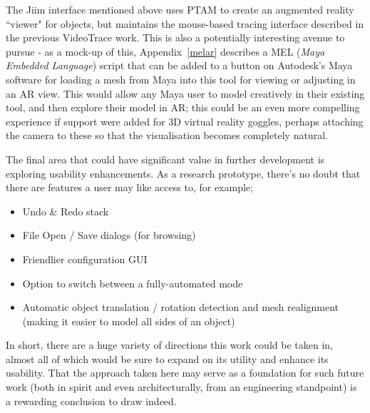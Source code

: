 \documentclass[a4paper,10pt]{article}
\begin{document}
The Jiim interface mentioned above uses PTAM to create an augmented reality ``viewer" for objects, but maintains the mouse-based tracing interface described in the previous VideoTrace work. This is also a potentially interesting avenue to pursue - as a mock-up of this, Appendix~\ref{melar} describes a MEL (\textit{Maya Embedded Language}) script that can be added to a button on Autodesk's Maya software for loading a mesh from Maya into this tool for viewing or adjusting in an AR view. This would allow any Maya user to model creatively in their existing tool, and then explore their model in AR; this could be an even more compelling experience if support were added for 3D virtual reality goggles, perhaps attaching the camera to these so that the visualisation becomes completely natural.

The final area that could have significant value in further development is exploring usability enhancements. As a research prototype, there's no doubt that there are features a user may like access to, for example;
\begin{itemize}
\item{Undo \& Redo stack}
\item{File Open / Save dialogs (for browsing)}
\item{Friendlier configuration GUI}
\item{Option to switch between a fully-automated mode}
\item{Automatic object translation / rotation detection and mesh realignment (making it easier to model all sides of an object)}
\end{itemize}

In short, there are a huge variety of directions this work could be taken in, almost all of which would be sure to expand on its utility and enhance its usability. That the approach taken here may serve as a foundation for such future work (both in spirit and even architecturally, from an engineering standpoint) is a rewarding conclusion to draw indeed.


\clearpage
\renewcommand*{\refname}{\section{References}}



\clearpage
\appendix
\end{document}
